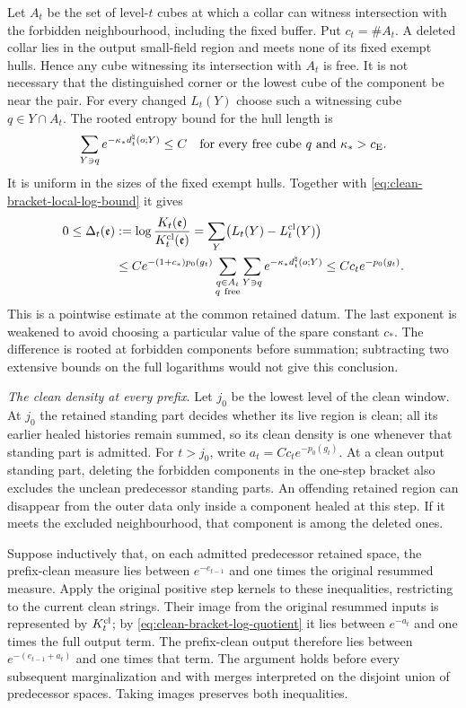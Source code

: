 \documentclass[11pt,letterpaper,reqno]{amsart}
\theoremstyle{definition}
\theoremstyle{remark}
\begin{document}
Let \(A_t\) be the set of level-\(t\) cubes at which a collar can
witness intersection with the forbidden neighbourhood, including the
fixed buffer. Put \(c_t=\#A_t\). A deleted collar lies in the output
small-field region and meets none of its fixed exempt hulls. Hence
any cube witnessing its intersection with \(A_t\) is free. It is not
necessary that the distinguished corner or the lowest cube of the
component be near the pair. For every changed \(L_t(Y)\) choose such
a witnessing cube \(q\in Y\cap A_t\). The rooted entropy bound for
the hull length is
\[
 \sum_{Y\ni q}e^{-\kappa_*d_t^\natural(o;Y)}\le C
 \quad\hbox{for every free cube $q$ and $\kappa_*>c_{\rm E}$.}
\]
It is uniform in the sizes of the fixed exempt hulls. Together with
\eqref{eq:clean-bracket-local-log-bound} it gives
\begin{align}
 0\le\Delta_t(\mathfrak e)
 &:=\log\frac{K_t(\mathfrak e)}{K_t^{\rm cl}(\mathfrak e)}
   =\sum_Y\bigl(L_t(Y)-L_t^{\rm cl}(Y)\bigr)\notag\\
 &\le C e^{-(1+c_*)p_0(g_t)}
       \sum_{\substack{q\in A_t\\q\ \mathrm{free}}}
       \sum_{Y\ni q}e^{-\kappa_*d^\natural_t(o;Y)}
 \le Cc_t e^{-p_0(g_t)}.
 \label{eq:clean-bracket-log-quotient}
\end{align}
This is a pointwise estimate at the common retained datum.
The last exponent is weakened to avoid choosing a particular value
of the spare constant \(c_*\). The difference is rooted at forbidden
components before summation; subtracting two extensive bounds on
the full logarithms would not give this conclusion.

\emph{The clean density at every prefix.}
Let \(j_0\) be the lowest level of the clean window. At \(j_0\) the
retained standing part decides whether its live region is clean;
all its earlier healed histories remain summed, so its clean density
is one whenever that standing part is admitted. For \(t>j_0\), write
\(a_t=Cc_t e^{-p_0(g_t)}\). At a clean output standing part,
deleting the forbidden components in the one-step bracket also
excludes the unclean predecessor standing parts. An offending
retained region can disappear from the outer data only inside a
component healed at this step. If it meets the excluded
neighbourhood, that component is among the deleted ones.

Suppose inductively that, on each admitted predecessor retained space,
the prefix-clean measure lies between \(e^{-e_{t-1}}\) and one times
the original resummed measure. Apply the original positive step
kernels to these inequalities, restricting to the current clean
strings. Their image from the original resummed inputs is represented
by \(K_t^{\rm cl}\); by
\eqref{eq:clean-bracket-log-quotient} it lies between \(e^{-a_t}\)
and one times the full output term. The prefix-clean output therefore
lies between \(e^{-(e_{t-1}+a_t)}\) and one times that term.
The argument holds before every subsequent marginalization and with
merges interpreted on the disjoint union of predecessor spaces.
Taking images preserves both inequalities.
\end{document}
